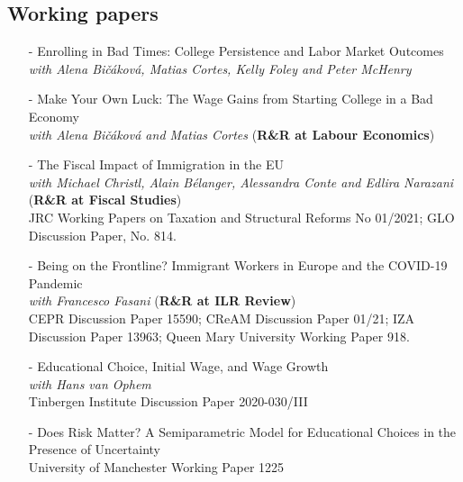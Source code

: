 \documentclass[11pt]{article}
\begin{document}
\nocite{mazza_scipioni_jepp}
\nocite{bicakova_cortes_mazza_ej}
\nocite{mazza_vohpem_hartog_le}
\nocite{mazza_vophem_jrssa}

\hspace*{20pt}%
\begin{minipage}[t]{0.9\textwidth}%
\vspace{-.9cm}
    \centering
    \renewcommand\refname{}
        
        
\end{minipage}

\vspace{-.3cm}

\subsection*{\sc Working papers}

\begin{itemize}[itemsep=0pt, leftmargin=20pt]
	\item[-]{Enrolling in Bad Times: College Persistence and Labor Market Outcomes}\\
	\emph{with Alena Bi\v{c}\'{a}kov\'{a}, Matias Cortes, Kelly Foley and Peter McHenry} 
\item [-]{Make Your Own Luck: The Wage Gains from Starting College in a Bad Economy}\\
\emph{with Alena Bi\v{c}\'{a}kov\'{a} and Matias Cortes} (\textbf{R\&R at Labour Economics})\\
\item [-]The Fiscal Impact of Immigration in the EU\\
\emph{with Michael Christl, Alain Bélanger, Alessandra Conte and Edlira Narazani} (\textbf{R\&R at Fiscal Studies}) \\
JRC Working Papers on Taxation and Structural Reforms No 01/2021; GLO Discussion Paper, No. 814.
\item [-]Being on the Frontline? Immigrant Workers in Europe and the COVID-19 Pandemic\\
\emph{with Francesco Fasani} (\textbf{R\&R at ILR Review})\\
CEPR Discussion Paper 15590; CReAM Discussion Paper 01/21; IZA Discussion Paper 13963; Queen Mary University Working Paper 918.
\item [-]Educational Choice, Initial Wage, and Wage Growth\\
\emph{with Hans van Ophem}\\
Tinbergen Institute Discussion Paper 2020-030/III
\item [-]Does Risk Matter? A Semiparametric Model for Educational Choices in the Presence of Uncertainty \\
University of Manchester Working Paper 1225

\end{itemize}
\end{document}
